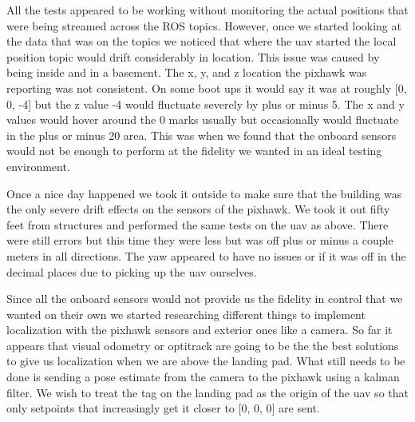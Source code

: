 \begin{itemize}
\begin{itemize}
\noindent All the tests appeared to be working without monitoring the actual positions that were being streamed across the ROS topics. However, once we started looking at the data that was on the topics we noticed that where the uav started the local position topic would drift considerably in location. This issue was caused by being inside and in a basement. The x, y, and z location the pixhawk was reporting was not consistent. On some boot ups it would say it was at roughly [0, 0, -4] but the z value -4 would fluctuate severely by plus or minus 5. The x and y values would hover around the 0 marks usually but occasionally would fluctuate in the plus or minus 20 area. This was when we found that the onboard sensors would not be enough to perform at the fidelity we wanted in an ideal testing environment.\par

\noindent Once a nice day happened we took it outside to make sure that the building was the only severe drift effects on the sensors of the pixhawk. We took it out fifty feet from structures and performed the same tests on the uav as above. There were still errors but this time they were less but was off plus or minus a couple meters in all directions. The yaw appeared to have no issues or if it was off in the decimal places due to picking up the uav ourselves.\par 

\noindent Since all the onboard sensors would not provide us the fidelity in control that we wanted on their own we started researching different things to implement localization with the pixhawk sensors and exterior ones like a camera. So far it appears that visual odometry or optitrack are going to be the the best solutions to give us localization when we are above the landing pad. What still needs to be done is sending a pose estimate from the camera to the pixhawk using a kalman filter. We wish to treat the tag on the landing pad as the origin of the uav so that only setpoints that increasingly get it closer to [0, 0, 0] are sent.\par

\end{itemize}

\end{itemize}



